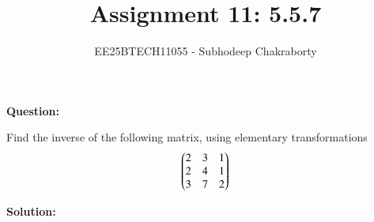 \documentclass[journal,12pt,onecolumn]{IEEEtran}
\theoremstyle{remark}
\begin{document}

\vspace{3cm}

\title{Assignment 11: 5.5.7}
\author{EE25BTECH11055 - Subhodeep Chakraborty}
\maketitle
\hrulefill
\bigskip

\renewcommand{\thefigure}{\theenumi}
\renewcommand{\thetable}{\theenumi}

\textbf{Question:}\par
Find the inverse of the following matrix, using elementary transformations\hfill{}
$$\begin{pmatrix}2&3&1\\2&4&1\\3&7&2\end{pmatrix}$$
\par
\textbf{Solution:}\par
\end{document}
